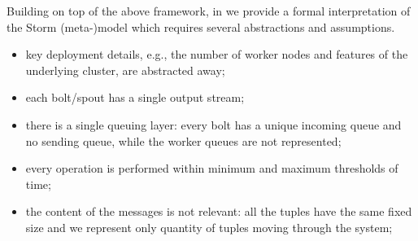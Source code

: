 Building on top of the above framework, in \cite{MBER16} we provide a formal interpretation of the Storm (meta-)model which requires several abstractions and assumptions.



\begin{itemize}
	\item key deployment details, e.g., the number of worker nodes and features of the underlying cluster, are abstracted away;
	\item each bolt/spout has a single output stream;
	\item %
	there is a single queuing layer: every bolt has a unique incoming queue and no sending queue, while the worker queues are not represented;
	\item every operation is performed within minimum and maximum thresholds of time;
	\item %
	the content of the messages is not relevant: all the tuples have the same fixed size and we represent only quantity of tuples moving through the system;
\end{itemize}

